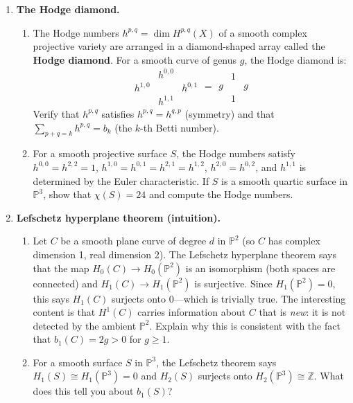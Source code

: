 \begin{enumerate}
    \item \textbf{The Hodge diamond.}
    \begin{enumerate}
        \item The Hodge numbers $h^{p,q} = \dim H^{p,q}(X)$ of a smooth complex projective variety are arranged in a diamond-shaped array called the \textbf{Hodge diamond}. For a smooth curve of genus $g$, the Hodge diamond is:
        \[
        \begin{array}{ccc}
         & h^{0,0} & \\
        h^{1,0} & & h^{0,1} \\
         & h^{1,1} &
        \end{array}
        = 
        \begin{array}{ccc}
         & 1 & \\
        g & & g \\
         & 1 &
        \end{array}
        \]
        Verify that $h^{p,q}$ satisfies $h^{p,q} = h^{q,p}$ (symmetry) and that $\sum_{p+q=k} h^{p,q} = b_k$ (the $k$-th Betti number).
        \item For a smooth projective surface $S$, the Hodge numbers satisfy $h^{0,0} = h^{2,2} = 1$, $h^{1,0} = h^{0,1} = h^{2,1} = h^{1,2}$, $h^{2,0} = h^{0,2}$, and $h^{1,1}$ is determined by the Euler characteristic. If $S$ is a smooth quartic surface in $\mathbb{P}^3$, show that $\chi(S) = 24$ and compute the Hodge numbers.
    \end{enumerate}

    \item \textbf{Lefschetz hyperplane theorem (intuition).}
    \begin{enumerate}
        \item Let $C$ be a smooth plane curve of degree $d$ in $\mathbb{P}^2$ (so $C$ has complex dimension 1, real dimension 2). The Lefschetz hyperplane theorem says that the map $H_0(C) \to H_0(\mathbb{P}^2)$ is an isomorphism (both spaces are connected) and $H_1(C) \to H_1(\mathbb{P}^2)$ is surjective. Since $H_1(\mathbb{P}^2) = 0$, this says $H_1(C)$ surjects onto 0---which is trivially true. The interesting content is that $H^1(C)$ carries information about $C$ that is \emph{new}: it is not detected by the ambient $\mathbb{P}^2$. Explain why this is consistent with the fact that $b_1(C) = 2g > 0$ for $g \geq 1$.
        \item For a smooth surface $S$ in $\mathbb{P}^3$, the Lefschetz theorem says $H_1(S) \cong H_1(\mathbb{P}^3) = 0$ and $H_2(S)$ surjects onto $H_2(\mathbb{P}^3) \cong \mathbb{Z}$. What does this tell you about $b_1(S)$?
    \end{enumerate}


\end{enumerate}
